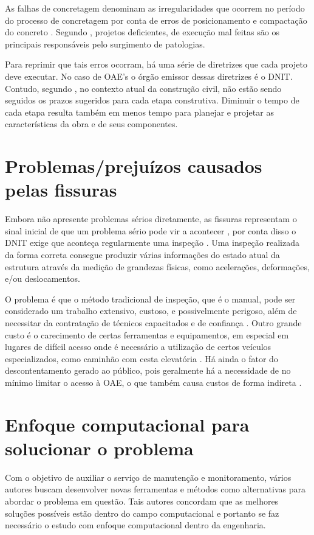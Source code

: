 As falhas de concretagem denominam as irregularidades que ocorrem no período do processo de concretagem por conta de erros de posicionamento e compactação do concreto \cite{statera}.
Segundo \cite{zhou2020concrete}, projetos deficientes, de execução mal feitas são os principais responsáveis pelo surgimento de patologias.

Para reprimir que tais erros ocorram, há uma série de diretrizes que cada projeto deve executar.
No caso de OAE's o órgão emissor dessas diretrizes é o DNIT. 
Contudo, segundo , no contexto atual da construção civil, não estão sendo seguidos os prazos sugeridos para cada etapa construtiva.
Diminuir o tempo de cada etapa resulta também em menos tempo para planejar e projetar as características da obra e de seus componentes.

\section{Problemas/prejuízos causados pelas fissuras}

Embora não apresente problemas sérios diretamente, as fissuras representam o sinal inicial de que um problema sério pode vir a acontecer \cite{alani2014integrated}, por conta disso o DNIT exige que aconteça regularmente uma inspeção \cite{dnit2004}.
Uma inspeção realizada da forma correta consegue produzir várias informações do estado atual da estrutura através da
medição de grandezas físicas, como acelerações, deformações, e/ou deslocamentos.

O problema é que o método tradicional de inspeção, que é o manual, pode ser considerado um trabalho extensivo, custoso, e possivelmente perigoso, além de necessitar da contratação de técnicos capacitados e de confiança \cite{adhikari2014image}.
Outro grande custo é o carecimento de certas ferramentas e equipamentos, em especial em lugares de difícil acesso onde é necessário a utilização de certos veículos especializados, como caminhão com cesta elevatória \cite{dorafshan2018bridge}.
Há ainda o fator do descontentamento gerado ao público, pois geralmente há a necessidade de no mínimo limitar o acesso à OAE, o que também causa custos de forma indireta \cite{catbas2018vision}.

\section{Enfoque computacional para solucionar o problema}

Com o objetivo de auxiliar o serviço de manutenção e monitoramento, vários autores buscam desenvolver novas ferramentas e métodos como alternativas para abordar o problema em questão.
Tais autores concordam que as melhores soluções possíveis estão dentro do campo computacional e portanto se faz necessário o estudo com enfoque computacional dentro da engenharia.


